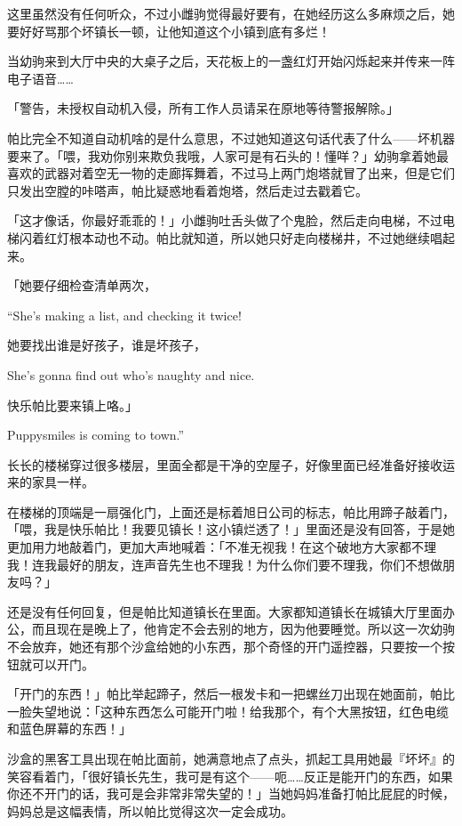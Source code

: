 这里虽然没有任何听众，不过小雌驹觉得最好要有，在她经历这么多麻烦之后，她要好好骂那个坏镇长一顿，让他知道这个小镇到底有多烂！

当幼驹来到大厅中央的大桌子之后，天花板上的一盏红灯开始闪烁起来并传来一阵电子语音……

「{\mt 警告，未授权自动机入侵，所有工作人员请呆在原地等待警报解除。}」

帕比完全不知道自动机啥的是什么意思，不过她知道这句话代表了什么——坏机器要来了。「喂，我劝你别来欺负我哦，人家可是有石头的！懂咩？」幼驹拿着她最喜欢的武器对着空无一物的走廊挥舞着，不过马上两门炮塔就冒了出来，但是它们只发出空膛的咔嗒声，帕比疑惑地看着炮塔，然后走过去戳着它。

「这才像话，你最好乖乖的！」小雌驹吐舌头做了个鬼脸，然后走向电梯，不过电梯闪着红灯根本动也不动。帕比就知道，所以她只好走向楼梯井，不过她继续唱起来。

\begin{song}
「她要仔细检查清单两次，

``She's making a list, and checking it twice!

\medskip

她要找出谁是好孩子，谁是坏孩子，

She's gonna find out who's naughty and nice.

\medskip

快乐帕比要来镇上咯。」

Puppysmiles is coming to town.''
\end{song}

长长的楼梯穿过很多楼层，里面全都是干净的空屋子，好像里面已经准备好接收运来的家具一样。

在楼梯的顶端是一扇强化门，上面还是标着旭日公司的标志，帕比用蹄子敲着门，「喂，我是快乐帕比！我要见镇长！这小镇烂透了！」里面还是没有回答，于是她更加用力地敲着门，更加大声地喊着：「不准无视我！在这个破地方大家都不理我！连我最好的朋友，连声音先生也不理我！为什么你们要不理我，你们不想做朋友吗？」

还是没有任何回复，但是帕比知道镇长在里面。大家都知道镇长在城镇大厅里面办公，而且现在是晚上了，他肯定不会去别的地方，因为他要睡觉。所以这一次幼驹不会放弃，她还有那个沙盒给她的小东西，那个奇怪的开门遥控器，只要按一个按钮就可以开门。

「开门的东西！」帕比举起蹄子，然后一根发卡和一把螺丝刀出现在她面前，帕比一脸失望地说：「这种东西怎么可能开门啦！给我那个，有个大黑按钮，红色电缆和蓝色屏幕的东西！」

沙盒的黑客工具出现在帕比面前，她满意地点了点头，抓起工具用她最『坏坏』的笑容看着门，「很好镇长先生，我可是有这个——呃……反正是能开门的东西，如果你还不开门的话，我可是会非常非常失望的！」当她妈妈准备打帕比屁屁的时候，妈妈总是这幅表情，所以帕比觉得这次一定会成功。

